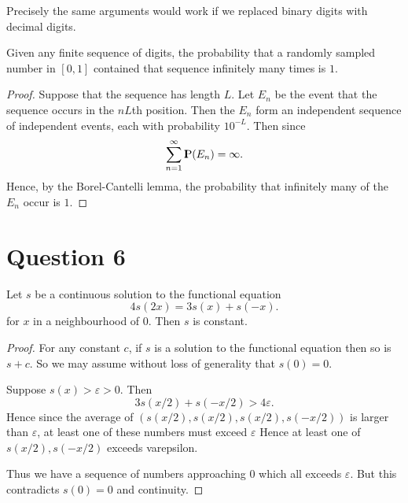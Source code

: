 \documentclass{unswmaths}
\begin{document}
\begin{remark}
    Precisely the same arguments would work if we replaced
    binary digits with decimal digits.
\end{remark}

\begin{theorem}
    Given any finite sequence of digits, the probability that a
    randomly sampled number in $[0,1]$
    contained that sequence infinitely many times is $1$.
\end{theorem}
\begin{proof}
    Suppose that the sequence has length $L$. Let $E_n$
    be the event that the sequence occurs in
    the $nL$th position. Then the $E_n$ form an independent sequence
    of independent events, each with probability $10^{-L}$. Then since
    \begin{equation*}
        \sum_{n=1}^\infty {\rm I\kern-.3em P}(E_n) = \infty.
    \end{equation*}
    Hence, by the Borel-Cantelli lemma, the probability that infinitely
    many of the $E_n$ occur is $1$.
\end{proof}

\section*{Question 6}

\begin{lemma}
\label{firstFunctional}
    Let $s$ be a continuous solution to the functional equation
    \begin{equation*}
        4s(2x) = 3s(x)+s(-x).
    \end{equation*}
    for $x$ in a neighbourhood of $0$.
    Then $s$ is constant.
\end{lemma}
\begin{proof}
    For any constant $c$, if $s$ is a solution to the functional
    equation then so is $s+c$. So we may assume without loss
    of generality that $s(0) = 0$.
    
    Suppose $s(x) > \varepsilon > 0$. Then 
    \begin{equation*}
        3s(x/2)+s(-x/2) > 4\varepsilon. 
    \end{equation*}
    Hence since the average of $(s(x/2),s(x/2),s(x/2),s(-x/2))$
    is larger than $\varepsilon$, at least one of these numbers
    must exceed $\varepsilon$
    Hence at least one of $s(x/2),s(-x/2)$ exceeds varepsilon. 
    
    Thus we have a sequence of numbers approaching $0$ which all
    exceeds $\varepsilon$. But this contradicts $s(0) = 0$
    and continuity.
\end{proof}
\end{document}
